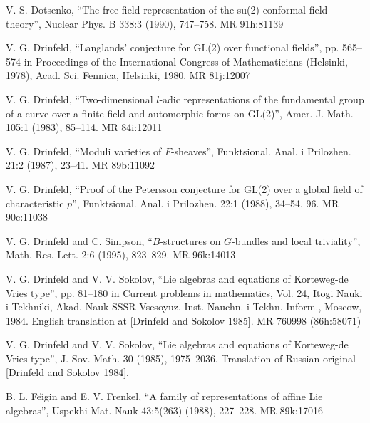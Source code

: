 \par\noindent [Dotsenko 1990] V. S. Dotsenko, ``The free field representation of the su(2) conformal field theory'', Nuclear Phys. B 338:3 (1990), 747--758. MR 91h:81139

\par\noindent [Drinfeld 1980] V. G. Drinfeld, ``Langlands' conjecture for GL(2) over functional fields'', pp. 565--574 in Proceedings of the International Congress of Mathematicians (Helsinki, 1978), Acad. Sci. Fennica, Helsinki, 1980. MR 81j:12007

\par\noindent [Drinfeld 1983] V. G. Drinfeld, ``Two-dimensional $l$-adic representations of the fundamental group of a curve over a finite field and automorphic forms on GL(2)'', Amer. J. Math. 105:1 (1983), 85--114. MR 84i:12011

\par\noindent [Drinfeld 1987] V. G. Drinfeld, ``Moduli varieties of $F$-sheaves'', Funktsional. Anal. i Prilozhen. 21:2 (1987), 23--41. MR 89b:11092

\par\noindent [Drinfeld 1988] V. G. Drinfeld, ``Proof of the Petersson conjecture for GL(2) over a global field of characteristic $p$'', Funktsional. Anal. i Prilozhen. 22:1 (1988), 34--54, 96. MR 90c:11038

\par{} V. G. Drinfeld and C. Simpson, ``$B$-structures on $G$-bundles and local triviality'', Math. Res. Lett. 2:6 (1995), 823--829. MR 96k:14013

\par{} V. G. Drinfeld and V. V. Sokolov, ``Lie algebras and equations of Korteweg-de Vries type'', pp. 81--180 in Current problems in mathematics, Vol. 24, Itogi Nauki i Tekhniki, Akad. Nauk SSSR Vsesoyuz. Inst. Nauchn. i Tekhn. Inform., Moscow, 1984. English translation at [Drinfeld and Sokolov 1985]. MR 760998 (86h:58071)

\par{} V. G. Drinfeld and V. V. Sokolov, ``Lie algebras and equations of Korteweg-de Vries type'', J. Sov. Math. 30 (1985), 1975--2036. Translation of Russian original [Drinfeld and Sokolov 1984].

\par{} B. L. Fe\u{\i}gin and E. V. Frenkel, ``A family of representations of affine Lie algebras'', Uspekhi Mat. Nauk 43:5(263) (1988), 227--228. MR 89k:17016

